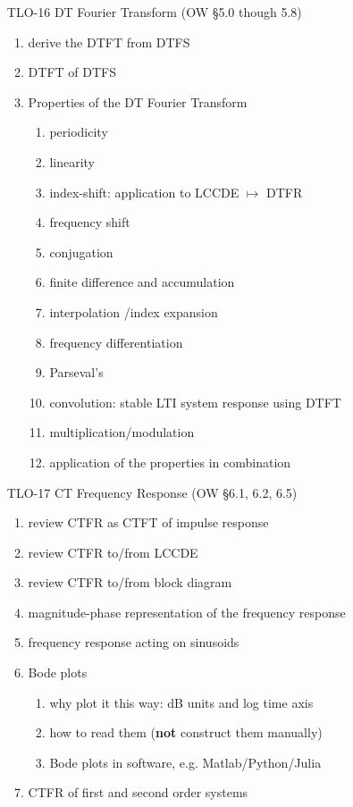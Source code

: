 \begin{enumerate}
\item[TLO-16] DT Fourier Transform (OW \S 5.0 though 5.8)
  \begin{enumerate}
  \item derive the DTFT from DTFS
  \item DTFT of DTFS
  \item Properties of the DT Fourier Transform
    \begin{enumerate}
    \item periodicity
    \item linearity
    \item index-shift: application to LCCDE $\mapsto$ DTFR
    \item frequency shift
    \item conjugation
    \item finite difference and accumulation
    \item interpolation /index expansion
    \item frequency differentiation
    \item Parseval's
    \item convolution: stable LTI system response using DTFT
    \item multiplication/modulation
    \item application of the properties in combination
    \end{enumerate}
  \end{enumerate}

\item[TLO-17] CT Frequency Response (OW \S 6.1, 6.2, 6.5)
  \begin{enumerate}
  \item review CTFR as CTFT of impulse response
  \item review CTFR to/from LCCDE
  \item review CTFR to/from block diagram 
  \item magnitude-phase representation of the frequency response
  \item frequency response acting on sinusoids
  \item Bode plots
    \begin{enumerate}
    \item why plot it this way: dB units and log time axis
    \item how to read them (\textbf{not} construct them manually)
    \item Bode plots in software, e.g. Matlab/Python/Julia
    \end{enumerate}
  \item CTFR of first and second order systems
  \end{enumerate}


\end{enumerate}

